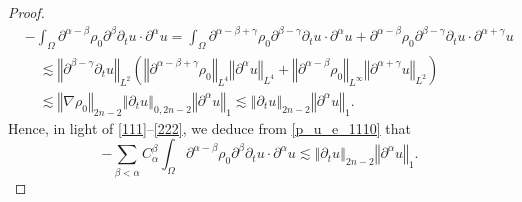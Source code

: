 \documentclass[a4paper,reqno,11pt]{amsart}
\numberwithin{equation}{section}
\providecommand{\norm}[1]{\left\Vert#1\right\Vert}
\providecommand{\norm}[1]{\left\Vert#1\right\Vert}
\begin{document}
\begin{proof}
\begin{equation}\label{222}
\begin{split}
 &- \int_\Omega {\partial}^{{\alpha}-\beta} \rho_0 {\partial}^{\beta}\partial_t u \cdot{\partial}^{\alpha}  u=\int_\Omega {\partial}^{{\alpha}-\beta+\gamma} \rho_0 {\partial}^{\beta-\gamma}\partial_t u \cdot{\partial}^{\alpha}  u
  +{\partial}^{{\alpha}-\beta} \rho_0 {\partial}^{\beta-\gamma}\partial_t u \cdot{\partial}^{{\alpha}+\gamma}  u
 \\&\quad{\lesssim} \norm{ {\partial}^{\beta-\gamma}{\partial_t} u}_{L^2}\left(\norm{ {\partial}^{{\alpha}-\beta+\gamma}\rho_0}_{L^4}  \norm{{\partial}^{\alpha}   u}_{L^4}+\norm{ {\partial}^{{\alpha}-\beta}\rho_0}_{L^\infty}  \norm{{\partial}^{{\alpha}+\gamma}   u}_{L^2}\right)
 \\ &\quad{\lesssim}\norm{ \nabla \rho_0}_{2n-2}  \norm{ {\partial_t} u}_{0,2n-2}\norm{{\partial}^{\alpha}   u}_{1}{\lesssim}  \norm{ {\partial_t} u}_{2n-2}\norm{{\partial}^{\alpha}   u}_{1}.
\end{split}
\end{equation}
Hence, in light of \eqref{111}--\eqref{222}, we deduce from \eqref{p_u_e_1110} that
\begin{equation}\label{i_de_142}
-\sum_{\beta<\alpha}C_\alpha^\beta\int_\Omega {\partial}^{{\alpha}-\beta} \rho_0 {\partial}^{\beta}\partial_t  u \cdot{\partial}^{\alpha}   u{\lesssim} \norm{ {\partial_t} u}_{2n-2}\norm{{\partial}^{\alpha}   u}_{1}.
\end{equation}


\end{proof}
\end{document}
